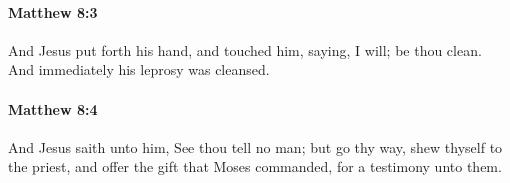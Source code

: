 		\paragraph{Matthew 8:3} %
			\label{MATTHEW-8-3}

			And Jesus put forth his hand, and touched him, saying, I will; be thou clean. And immediately his leprosy was cleansed.

			\begin{framed}
			\scriptsize
				\begin{compactdesc}
					\item[SBLG] 
				\end{compactdesc}
			\end{framed}

		\paragraph{Matthew 8:4} %
			\label{MATTHEW-8-4}

			And Jesus saith unto him, See thou tell no man; but go thy way, shew thyself to the priest, and offer the gift that Moses commanded, for a testimony unto them.

